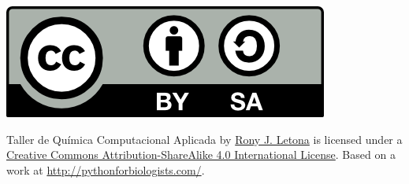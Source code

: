 \documentclass[10pt,letterpaper]{article}
\begin{document}
\noindent \includegraphics{img/cc_big.png}

\noindent Taller de Qu\'imica Computacional Aplicada by \href{http://github.com/zronyj/TQCA}{Rony J. Letona} is licensed under a \href{http://creativecommons.org/licenses/by-sa/4.0/}{Creative Commons Attribution-ShareAlike 4.0 International License}.
Based on a work at \url{http://pythonforbiologists.com/}.
\end{document}
